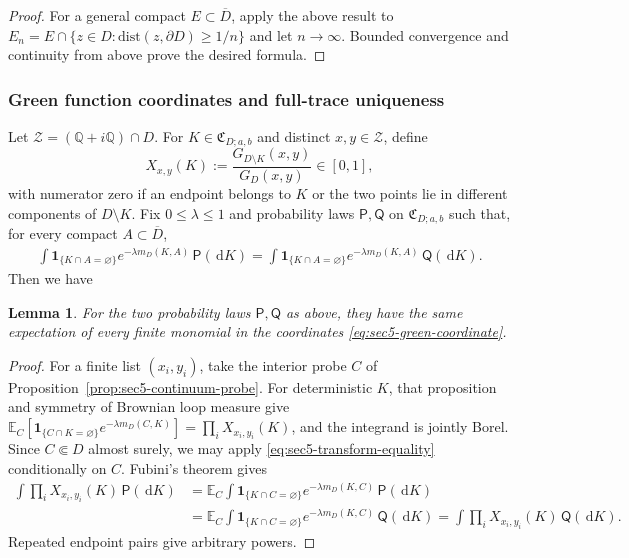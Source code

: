 \documentclass[11pt]{article}
\numberwithin{equation}{section}
\newcommand{\Q}{\mathbb{Q}}
\newcommand{\E}{\mathbb{E}}
\newcommand{\1}{\mathbf{1}}
\newcommand{\dist}{\mathrm{dist}}
\newtheorem{lemma}[theorem]{Lemma}
\newcommand\ol[1]{\overline{#1}}
\newcommand{\one}{\mathbf 1}
\newcommand{\dd}{\,\mathrm d}
\begin{document}
\begin{proof}
For a general compact \(E\subset\ol D\), apply the above result to
\(E_n=E\cap\{z\in D:\dist(z,\partial D)\geq1/n\}\) 
and let \(n\to\infty\).  
Bounded convergence
and continuity from above prove the desired formula.
\end{proof}

\subsubsection{Green function coordinates and full-trace uniqueness}
\label{subsec:sec5-green-coordinates}

Let \(\mathcal Z=(\Q+i\Q)\cap D\).  For
\(K\in\mathfrak C_{D;a,b}\) and distinct \(x,y\in\mathcal Z\), define
\begin{equation}\label{eq:sec5-green-coordinate}
 X_{x,y}(K)
 :=\frac{G_{D\setminus K}(x,y)}{G_D(x,y)}\in[0,1],
\end{equation}
with numerator zero if an endpoint belongs to \(K\) or the two points lie
 in different components of \(D\setminus K\). Fix \(0\leq\lambda\leq1\) and probability laws
\(\mathsf P,\mathsf Q\) on \(\mathfrak C_{D;a,b}\) such that, for every
compact \(A\subset \ol D\),
\begin{align}\label{eq:sec5-transform-equality}
 \int \one_{\{K\cap A=\varnothing\}}
 e^{-\lambda m_D(K,A)}\,\mathsf P(\dd K)=\int \one_{\{K\cap A=\varnothing\}}
 e^{-\lambda m_D(K,A)}\,\mathsf Q(\dd K).
\end{align}
Then we have
\begin{lemma}\label{lem:sec5-green-moments}
For the two probability laws
\(\mathsf P,\mathsf Q\) as above, they have the same expectation of every finite monomial in the coordinates
\eqref{eq:sec5-green-coordinate}.
\end{lemma}

\begin{proof}
For a finite list \((x_i,y_i)\), take the interior probe \(C\) of
Proposition~\ref{prop:sec5-continuum-probe}.  For deterministic \(K\), that
proposition and symmetry of Brownian loop measure give $ \E_C\!\left[
 \one_{\{C\cap K=\varnothing\}}e^{-\lambda m_D(C,K)}\right]
 =\prod_iX_{x_i,y_i}(K)$,
and the integrand
is jointly Borel.
Since \(C\Subset D\) almost surely, we may apply \eqref{eq:sec5-transform-equality} conditionally on \(C\). Fubini's theorem gives
\begin{align*}
 \int\prod_iX_{x_i,y_i}(K)\,\mathsf P(\dd K)
 &=\E_C\int
   \one_{\{K\cap C=\varnothing\}}e^{-\lambda m_D(K,C)}
   \,\mathsf P(\dd K)\\
 &=\E_C\int
   \one_{\{K\cap C=\varnothing\}}e^{-\lambda m_D(K,C)}
   \,\mathsf Q(\dd K)
 =\int\prod_iX_{x_i,y_i}(K)\,\mathsf Q(\dd K).
\end{align*}
Repeated endpoint pairs give
arbitrary powers.
\end{proof}
\end{document}
